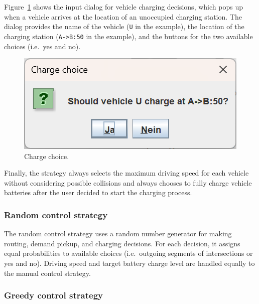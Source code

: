 \documentclass[a4paper,twoside]{article}
\begin{document}
	Figure~\ref{fig:manual-controller-charge} shows the input dialog for vehicle charging decisions, which pops up when a vehicle arrives at the location of an unoccupied charging station.
	The dialog provides the name of the vehicle (\texttt{U} in the example), the location of the charging station (\texttt{A->B:50} in the example), and the buttons for the two available choices (i.e.\ yes and no).
	\begin{figure}[!ht]
		\centering
		\includegraphics[scale=0.3]{../../screenshots/manual-controller-charge.png}
		\caption{Charge choice.}
		\label{fig:manual-controller-charge}
	\end{figure}
	Finally, the strategy always selects the maximum driving speed for each vehicle without considering possible collisions and always chooses to fully charge vehicle batteries after the user decided to start the charging process.
	
	\subsubsection*{Random control strategy}
	\label{sec:controller-random}
	
	The random control strategy uses a random number generator for making routing, demand pickup, and charging decisions.
	For each decision, it assigns equal probabilities to available choices (i.e.\ outgoing segments of intersections or yes and no).
	Driving speed and target battery charge level are handled equally to the manual control strategy.
	
	\subsubsection*{Greedy control strategy}
	\label{sec:controller-greedy}
	
\end{document}
